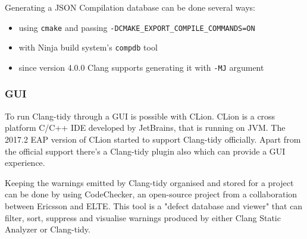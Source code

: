 \par Generating a JSON Compilation database can be done several ways: 
\begin{itemize}
	\item using \verb|cmake| and passing \verb|-DCMAKE_EXPORT_COMPILE_COMMANDS=ON|
	\item with Ninja build system's \verb|compdb| tool\cite{ninja_build_system}
	\item since version 4.0.0 Clang supports generating it with \verb|-MJ| argument\cite{clang_release_notes}
\end{itemize}
\subsubsection{GUI}
\par To run Clang-tidy through a GUI is possible with CLion. CLion is a cross platform C/C++ IDE developed by JetBrains, that is running on JVM. The 2017.2 EAP version of CLion started to support Clang-tidy officially\cite{clion_tidy_eap}. Apart from the official support there's a Clang-tidy plugin\cite{clion_tidy_plugin} also which can provide a GUI experience. \medskip
\par Keeping the warnings emitted by Clang-tidy organised and stored for a project can be done by using CodeChecker\cite{codechecker_gsd}, an open-source project from a collaboration between Ericsson and ELTE. This tool is a "defect database and viewer"\cite{codechecker} that can filter, sort, suppress and visualise warnings produced by either Clang Static Analyzer or Clang-tidy.